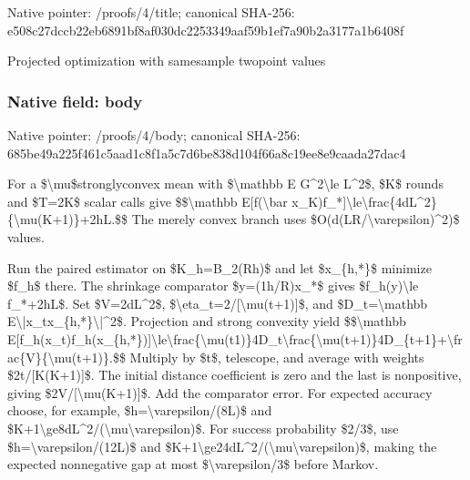 \documentclass[10pt,a4paper]{article}
\begin{document}
Native pointer: /proofs/4/title; canonical SHA-256: e508c27dccb22eb6891bf8af\allowbreak{}030dc2253349aaf59b1ef7a9\allowbreak{}0b2a3177a1b6408f


Projected optimization with samesample twopoint values


\subsubsection{Native field: body}


Native pointer: /proofs/4/body; canonical SHA-256: 685be49a225f461c5aad1c8f\allowbreak{}1a5c7d6be838d104f66a8c19\allowbreak{}ee8e9caada27dac4


For a \$\textbackslash{}mu\$stronglyconvex mean with \$\textbackslash{}mathbb E G\textasciicircum{}2\textbackslash{}le L\textasciicircum{}2\$, \$K\$ rounds and \$T=2K\$ scalar calls give
\$\$\textbackslash{}mathbb E[f(\textbackslash{}bar x\_K)f\_*]\textbackslash{}le\textbackslash{}frac\{4dL\textasciicircum{}2\}\allowbreak{}\{\textbackslash{}mu(K+1)\}+2hL.\$\$
The merely convex branch uses \$O(d(LR/\textbackslash{}varepsilon)\textasciicircum{}2)\$ values.

Run the paired estimator on \$K\_h=B\_2(Rh)\$ and let \$x\_\{h,*\}\$ minimize \$f\_h\$ there. The shrinkage comparator \$y=(1h/R)x\_*\$ gives \$f\_h(y)\textbackslash{}le f\_*+2hL\$. Set \$V=2dL\textasciicircum{}2\$, \$\textbackslash{}eta\_t=2/[\textbackslash{}mu(t+1)]\$, and \$D\_t=\textbackslash{}mathbb E\textbackslash{}|x\_tx\_\{h,*\}\textbackslash{}|\textasciicircum{}2\$. Projection and strong convexity yield
\$\$\textbackslash{}mathbb E[f\_h(x\_t)f\_h(x\_\{h,*\})]\allowbreak{}\textbackslash{}le\textbackslash{}frac\{\textbackslash{}mu(t1)\}4D\_t\textbackslash{}\allowbreak{}frac\{\textbackslash{}mu(t+1)\}4D\_\{t+1\}+\textbackslash{}\allowbreak{}frac\{V\}\{\textbackslash{}mu(t+1)\}.\$\$
Multiply by \$t\$, telescope, and average with weights \$2t/[K(K+1)]\$. The initial distance coefficient is zero and the last is nonpositive, giving \$2V/[\textbackslash{}mu(K+1)]\$. Add the comparator error. For expected accuracy choose, for example, \$h=\textbackslash{}varepsilon/(8L)\$ and \$K+1\textbackslash{}ge8dL\textasciicircum{}2/(\textbackslash{}mu\textbackslash{}varepsilon)\$. For success probability \$2/3\$, use \$h=\textbackslash{}varepsilon/(12L)\$ and \$K+1\textbackslash{}ge24dL\textasciicircum{}2/(\textbackslash{}mu\textbackslash{}varepsilon)\$, making the expected nonnegative gap at most \$\textbackslash{}varepsilon/3\$ before Markov.
\end{document}
